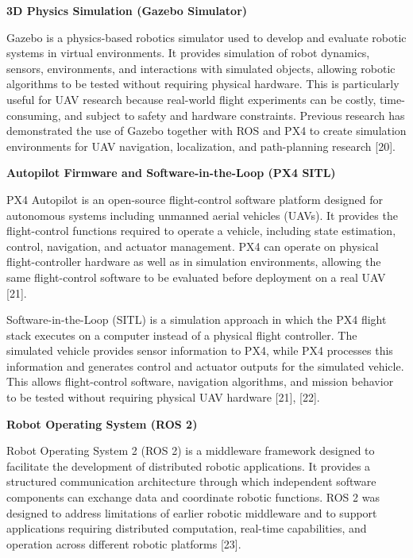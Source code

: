 \documentclass[12pt]{article}
\newcommand{\infofont}{\fontsize{16pt}{19.2pt}\selectfont}
\newcommand{\MinorHead}[1]{\vspace{0.6em}\noindent{\infofont\bfseries #1}\vspace{0.2em}\par}
\begin{document}
\MinorHead{2.1.3.4 Robotics Simulation and Middleware}

\textbf{\infofont 3D Physics Simulation (Gazebo Simulator)}\par
\infofont
Gazebo is a physics-based robotics simulator used to develop and evaluate robotic
systems in virtual environments. It provides simulation of robot dynamics, sensors,
environments, and interactions with simulated objects, allowing robotic algorithms to be
tested without requiring physical hardware. This is particularly useful for UAV research
because real-world flight experiments can be costly, time-consuming, and subject to safety
and hardware constraints. Previous research has demonstrated the use of Gazebo together
with ROS and PX4 to create simulation environments for UAV navigation, localization, and
path-planning research [20].

\textbf{\infofont Autopilot Firmware and Software-in-the-Loop (PX4 SITL)}\par
\infofont
PX4 Autopilot is an open-source flight-control software platform designed for
autonomous systems including unmanned aerial vehicles (UAVs). It provides the
flight-control functions required to operate a vehicle, including state estimation, control,
navigation, and actuator management. PX4 can operate on physical flight-controller hardware
as well as in simulation environments, allowing the same flight-control software to be
evaluated before deployment on a real UAV [21].

Software-in-the-Loop (SITL) is a simulation approach in which the PX4 flight stack
executes on a computer instead of a physical flight controller. The simulated vehicle
provides sensor information to PX4, while PX4 processes this information and generates
control and actuator outputs for the simulated vehicle. This allows flight-control software,
navigation algorithms, and mission behavior to be tested without requiring physical UAV
hardware [21], [22].

\textbf{\infofont Robot Operating System (ROS 2)}\par
\infofont
Robot Operating System 2 (ROS 2) is a middleware framework designed to facilitate the
development of distributed robotic applications. It provides a structured communication
architecture through which independent software components can exchange data and
coordinate robotic functions. ROS 2 was designed to address limitations of earlier robotic
middleware and to support applications requiring distributed computation, real-time
capabilities, and operation across different robotic platforms [23].
\end{document}
